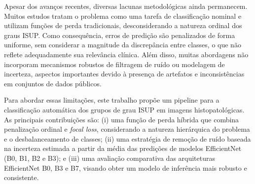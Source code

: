 Apesar dos avanços recentes, diversas lacunas metodológicas ainda permanecem. Muitos estudos tratam o problema como uma tarefa de classificação nominal e utilizam funções de perda tradicionais, desconsiderando a natureza ordinal dos graus ISUP. Como consequência, erros de predição são penalizados de forma uniforme, sem considerar a magnitude da discrepância entre classes, o que não reflete adequadamente sua relevância clínica. Além disso, muitas abordagens não incorporam mecanismos robustos de filtragem de ruído ou modelagem de incerteza, aspectos importantes devido à presença de artefatos e inconsistências em conjuntos de dados públicos.

Para abordar essas limitações, este trabalho propõe um pipeline para a classificação automática dos grupos de grau ISUP em imagens histopatológicas. As principais contribuições são: (i) uma função de perda híbrida que combina penalização ordinal e \textit{focal loss}, considerando a natureza hierárquica do problema e o desbalanceamento de classes; (ii) uma estratégia de remoção de ruído baseada na incerteza estimada a partir da média das predições de modelos EfficientNet (B0, B1, B2 e B3); e (iii) uma avaliação comparativa das arquiteturas EfficientNet B0, B3 e B7, visando obter um modelo de inferência mais robusto e consistente.